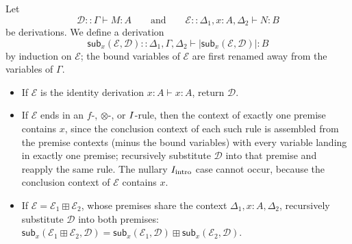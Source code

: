 \begin{definition}
\label{def:substitution}
Let
\[
\mathcal{D} :: \Gamma \vdash M : A
\qquad\text{and}\qquad
\mathcal{E} :: \Delta_1,x:A,\Delta_2 \vdash N:B
\]
be derivations.  We define a derivation
\[
\mathsf{sub}_x(\mathcal{E},\mathcal{D})
  :: \Delta_1,\Gamma,\Delta_2 \vdash |\mathsf{sub}_x(\mathcal{E},\mathcal{D})| : B
\]
by induction on $\mathcal{E}$; the bound variables of $\mathcal{E}$ are first renamed away from the variables of $\Gamma$.
\begin{itemize}
  \item If $\mathcal{E}$ is the identity derivation $x : A \vdash x : A$, return $\mathcal{D}$.
  \item If $\mathcal{E}$ ends in an $f$-, $\otimes$-, or $I$-rule, then the context of exactly one premise contains $x$, since the conclusion context of each such rule is assembled from the premise contexts (minus the bound variables) with every variable landing in exactly one premise; recursively substitute $\mathcal{D}$ into that premise and reapply the same rule.
  The nullary $I_{\text{intro}}$ case cannot occur, because the conclusion context of $\mathcal{E}$ contains $x$.
  \item If $\mathcal{E} = \mathcal{E}_1 \boxplus \mathcal{E}_2$, whose premises share the context $\Delta_1, x : A, \Delta_2$, recursively substitute $\mathcal{D}$ into both premises:
  $\mathsf{sub}_x(\mathcal{E}_1 \boxplus \mathcal{E}_2, \mathcal{D}) = \mathsf{sub}_x(\mathcal{E}_1, \mathcal{D}) \boxplus \mathsf{sub}_x(\mathcal{E}_2, \mathcal{D})$.
\end{itemize}
\end{definition}

